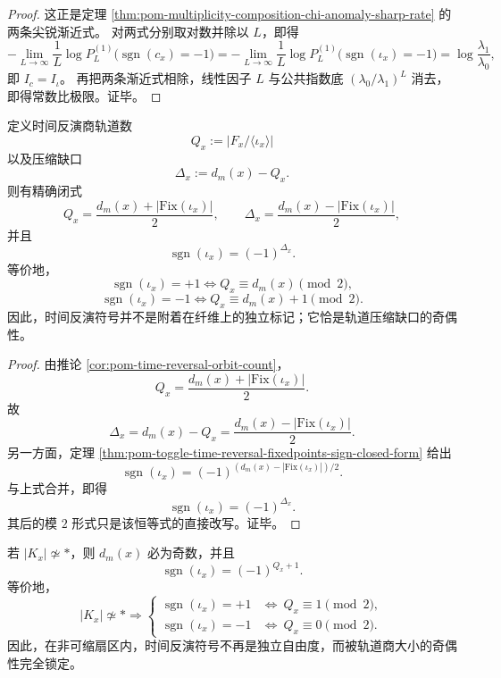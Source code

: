 \begin{proof}
这正是定理 \ref{thm:pom-multiplicity-composition-chi-anomaly-sharp-rate} 的两条尖锐渐近式。
对两式分别取对数并除以 \(L\)，即得
\[
-\lim_{L\to\infty}\frac{1}{L}\log P_L^{(1)}\!\bigl(\operatorname{sgn}(c_x)=-1\bigr)
=
-\lim_{L\to\infty}\frac{1}{L}\log P_L^{(1)}\!\bigl(\operatorname{sgn}(\iota_x)=-1\bigr)
=
\log\frac{\lambda_1}{\lambda_0},
\]
即 \(I_c=I_\iota\)。
再把两条渐近式相除，线性因子 \(L\) 与公共指数底 \((\lambda_0/\lambda_1)^L\) 消去，即得常数比极限。证毕。
\end{proof}

\begin{theorem}[时间反演轨道压缩缺口的奇偶律]\label{thm:conclusion-time-reversal-orbit-compression-gap-parity}
定义时间反演商轨道数
\[
Q_x:=|F_x/\langle \iota_x\rangle|
\]
以及压缩缺口
\[
\Delta_x:=d_m(x)-Q_x.
\]
则有精确闭式
\[
Q_x=\frac{d_m(x)+|\mathrm{Fix}(\iota_x)|}{2},
\qquad
\Delta_x=\frac{d_m(x)-|\mathrm{Fix}(\iota_x)|}{2},
\]
并且
\[
\operatorname{sgn}(\iota_x)=(-1)^{\Delta_x}.
\]
等价地，
\[
\operatorname{sgn}(\iota_x)=+1
\iff
Q_x\equiv d_m(x)\pmod 2,
\]
\[
\operatorname{sgn}(\iota_x)=-1
\iff
Q_x\equiv d_m(x)+1\pmod 2.
\]
因此，时间反演符号并不是附着在纤维上的独立标记；它恰是轨道压缩缺口的奇偶性。
\end{theorem}

\begin{proof}
由推论 \ref{cor:pom-time-reversal-orbit-count}，
\[
Q_x=\frac{d_m(x)+|\mathrm{Fix}(\iota_x)|}{2}.
\]
故
\[
\Delta_x=d_m(x)-Q_x=\frac{d_m(x)-|\mathrm{Fix}(\iota_x)|}{2}.
\]
另一方面，定理 \ref{thm:pom-toggle-time-reversal-fixedpoints-sign-closed-form} 给出
\[
\operatorname{sgn}(\iota_x)=(-1)^{(d_m(x)-|\mathrm{Fix}(\iota_x)|)/2}.
\]
与上式合并，即得
\[
\operatorname{sgn}(\iota_x)=(-1)^{\Delta_x}.
\]
其后的模 \(2\) 形式只是该恒等式的直接改写。证毕。
\end{proof}

\begin{corollary}[非可缩扇区上的时间反演符号完全由轨道商奇偶决定]\label{cor:conclusion-noncontractible-time-reversal-sign-orbit-quotient-parity}
若 \(|K_x|\not\simeq *\)，则 \(d_m(x)\) 必为奇数，并且
\[
\operatorname{sgn}(\iota_x)=(-1)^{Q_x+1}.
\]
等价地，
\[
|K_x|\not\simeq *
\Longrightarrow
\begin{cases}
\operatorname{sgn}(\iota_x)=+1 &\Longleftrightarrow\ Q_x\equiv 1\pmod 2,\\[1mm]
\operatorname{sgn}(\iota_x)=-1 &\Longleftrightarrow\ Q_x\equiv 0\pmod 2.
\end{cases}
\]
因此，在非可缩扇区内，时间反演符号不再是独立自由度，而被轨道商大小的奇偶性完全锁定。
\end{corollary}

